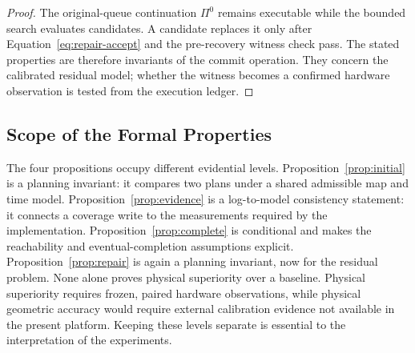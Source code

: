 \begin{proof}
The original-queue continuation $\Pi^0$ remains executable while the bounded search evaluates candidates. A candidate replaces it only after Equation~\eqref{eq:repair-accept} and the pre-recovery witness check pass. The stated properties are therefore invariants of the commit operation. They concern the calibrated residual model; whether the witness becomes a confirmed hardware observation is tested from the execution ledger.
\end{proof}

\subsection{Scope of the Formal Properties}

The four propositions occupy different evidential levels. Proposition~\ref{prop:initial} is a planning invariant: it compares two plans under a shared admissible map and time model. Proposition~\ref{prop:evidence} is a log-to-model consistency statement: it connects a coverage write to the measurements required by the implementation. Proposition~\ref{prop:complete} is conditional and makes the reachability and eventual-completion assumptions explicit. Proposition~\ref{prop:repair} is again a planning invariant, now for the residual problem. None alone proves physical superiority over a baseline. Physical superiority requires frozen, paired hardware observations, while physical geometric accuracy would require external calibration evidence not available in the present platform. Keeping these levels separate is essential to the interpretation of the experiments.

